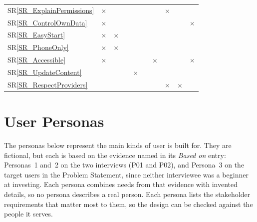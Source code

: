 \documentclass[12pt]{article}
\newcommand{\srref}[1]{SR\ref{#1}}
\begin{document}
\begin{table}[H]
\begin{tabular}{l*{9}{c}}
    \srref{SR_ExplainPermissions}  & $\times$                                 &              &              &              &              &              & $\times$     &              &              \\
    \srref{SR_ControlOwnData}      & $\times$                                 &              &              &              &              &              &              &              & $\times$     \\
    \srref{SR_EasyStart}           & $\times$                                 & $\times$     &              &              &              &              &              &              &              \\
    \srref{SR_PhoneOnly}           & $\times$                                 & $\times$     &              &              &              &              &              &              &              \\
    \srref{SR_Accessible}          & $\times$                                 &              &              &              &              & $\times$     &              &              & $\times$     \\
    \srref{SR_UpdateContent}       &                                          &              &              & $\times$     &              &              &              &              &              \\
    \srref{SR_RespectProviders}    &                                          &              &              &              &              &              & $\times$     & $\times$     &              \\
    \bottomrule
  \end{tabular}
\end{table}
\section{User Personas}

The personas below represent the main kinds of user \progname{} is built for.
They are fictional, but each is based on the evidence named in its
\emph{Based on} entry: Personas~1 and~2 on the two interviews (P01 and P02),
and Persona~3 on the target users in the Problem Statement, since neither
interviewee was a beginner at investing. Each persona combines needs from that
evidence with invented details, so no persona describes a real person. Each
persona lists the stakeholder requirements
that matter most to them, so the design can be checked against the people it
serves.
\end{document}
